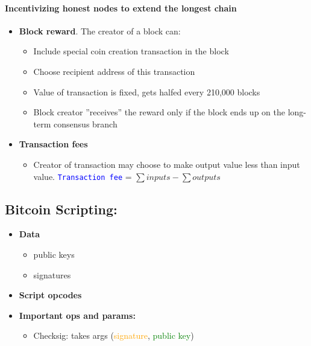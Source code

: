 \paragraph{Incentivizing honest nodes to extend the longest chain}
\begin{itemize}
    \item \textbf{Block reward}. The creator of a block can:
    \begin{itemize}
        \item Include special coin creation transaction in the block 
        \item Choose recipient address of this transaction
        \item Value of transaction is fixed, gets halfed every 210,000 blocks
        \item Block creator ”receives” the reward only if the block ends up on the long-term consensus branch
    \end{itemize}{}
    \item \textbf{Transaction fees}
    \begin{itemize}
        \item Creator of transaction may choose to make output value less than input value. \texttt{\textcolor{blue}{Transaction fee}} = $\sum i n p u t s-\sum o u t p u t s$
    \end{itemize}{}
\end{itemize}{}
\subsection{Bitcoin Scripting:}
\begin{itemize}
    \item \textbf{Data}
    \begin{itemize}
        \item public keys
        \item signatures
    \end{itemize}{}
    \item \textbf{Script opcodes}
    {}
    \item \textbf{Important ops and params:}
    \begin{itemize}
        \item Checksig: takes args (\textcolor{orange}{signature}, \textcolor{green}{public key})
    \end{itemize}
\end{itemize}{}
